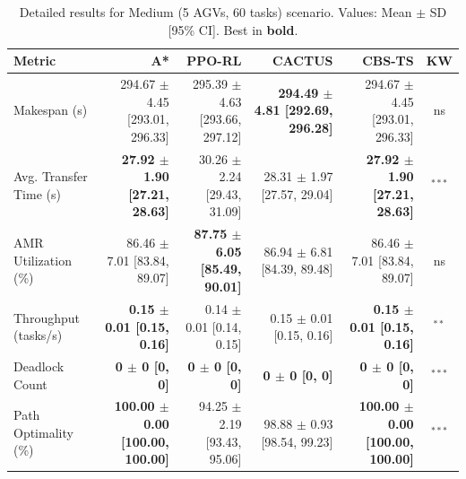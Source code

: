 \documentclass[review]{elsarticle}
\begin{document}
\begin{table}[htbp]
\centering
\caption{Detailed results for Medium (5 AGVs, 60 tasks) scenario. Values: Mean $\pm$ SD [95\% CI]. Best in \textbf{bold}.}
\label{tab:detail_s2_medium}
\small
\begin{tabular}{@{}lrrrrc@{}}
\toprule
\textbf{Metric} & \textbf{A*} & \textbf{PPO-RL} & \textbf{CACTUS} & \textbf{CBS-TS} & \textbf{KW} \\
\midrule
Makespan (s) & 294.67 $\pm$ 4.45 [293.01, 296.33] & 295.39 $\pm$ 4.63 [293.66, 297.12] & \textbf{294.49 $\pm$ 4.81 [292.69, 296.28]} & 294.67 $\pm$ 4.45 [293.01, 296.33] & ns \\
Avg. Transfer Time (s) & \textbf{27.92 $\pm$ 1.90 [27.21, 28.63]} & 30.26 $\pm$ 2.24 [29.43, 31.09] & 28.31 $\pm$ 1.97 [27.57, 29.04] & \textbf{27.92 $\pm$ 1.90 [27.21, 28.63]} & $^{***}$ \\
AMR Utilization (\%) & 86.46 $\pm$ 7.01 [83.84, 89.07] & \textbf{87.75 $\pm$ 6.05 [85.49, 90.01]} & 86.94 $\pm$ 6.81 [84.39, 89.48] & 86.46 $\pm$ 7.01 [83.84, 89.07] & ns \\
Throughput (tasks/s) & \textbf{0.15 $\pm$ 0.01 [0.15, 0.16]} & 0.14 $\pm$ 0.01 [0.14, 0.15] & 0.15 $\pm$ 0.01 [0.15, 0.16] & \textbf{0.15 $\pm$ 0.01 [0.15, 0.16]} & $^{**}$ \\
Deadlock Count & \textbf{0 $\pm$ 0 [0, 0]} & \textbf{0 $\pm$ 0 [0, 0]} & \textbf{0 $\pm$ 0 [0, 0]} & \textbf{0 $\pm$ 0 [0, 0]} & $^{***}$ \\
Path Optimality (\%) & \textbf{100.00 $\pm$ 0.00 [100.00, 100.00]} & 94.25 $\pm$ 2.19 [93.43, 95.06] & 98.88 $\pm$ 0.93 [98.54, 99.23] & \textbf{100.00 $\pm$ 0.00 [100.00, 100.00]} & $^{***}$ \\
\bottomrule
\end{tabular}
\end{table}
\end{document}

